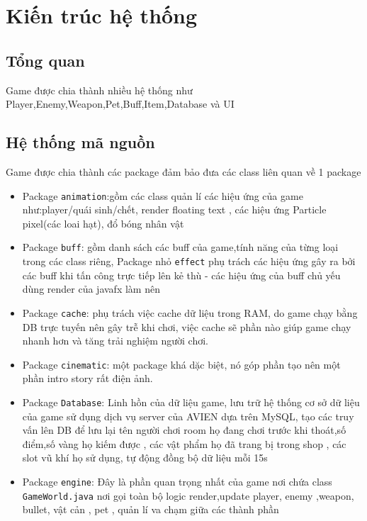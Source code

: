 \documentclass[12pt,a4paper]{report}
\begin{document}
    \chapter{Kiến trúc hệ thống}


    \section{Tổng quan}
    Game được chia thành nhiều hệ thống như Player,Enemy,Weapon,Pet,Buff,Item,Database và UI


    \section{Hệ thống mã nguồn}
    Game được chia thành các package đảm bảo đưa các class liên quan về 1 package
    \begin{itemize}
        \item Package \texttt{animation}:gồm các class quản lí các hiệu ứng của game như:player/quái sinh/chết,
        render floating text , các hiệu ứng Particle pixel(các loai hạt), đổ bóng nhân vật
        \item  Package \texttt{buff}: gồm danh sách các buff của game,tính năng của từng loại trong các class
        riêng, Package nhỏ  \texttt{effect} phụ trách các hiệu ứng gây ra bởi các buff khi tấn công
        trực tiếp lên kẻ thù - các hiệu ứng của buff chủ yếu dùng render của javafx làm nên
        \item Package \texttt{cache}: phụ trách việc cache dữ liệu trong RAM, do game chạy bằng DB
        trực tuyến nên gây trễ khi chơi, việc cache sẽ phần nào giúp game chạy nhanh hơn và tăng trải nghiệm người chơi.
        \item Package \texttt{cinematic}: một package khá dặc biệt, nó góp phần tạo nên một phần intro story
        rất điện ảnh.
        \item Package \texttt{Database}: Linh hồn của dữ liệu game, lưu trữ hệ thống cơ sở dữ liệu của game
        sử dụng dịch vụ server của AVIEN dựa trên MySQL, tạo các truy vấn lên DB để lưu lại tên người chơi
        room họ đang chơi trước khi thoát,số điểm,số vàng họ kiếm được , các vật phẩm họ đã trang bị trong shop
        , các slot vũ khí họ sử dụng, tự động đồng bộ dữ liệu mỗi 15s
        \item Package \texttt{engine}: Đây là phần quan trọng nhất của game nơi chứa class \texttt{GameWorld.java}
        nơi gọi toàn bộ logic render,update player, enemy ,weapon, bullet, vật cản , pet , quản lí va chạm giữa các thành phần

\end{itemize}
\end{document}
